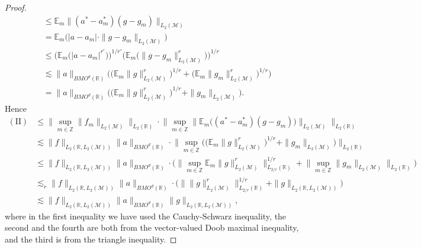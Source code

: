 \documentclass[oneside,english,a4wide]{amsart}
\numberwithin{equation}{section}
\numberwithin{figure}{section}
\theoremstyle{plain}
\theoremstyle{plain}
\theoremstyle{definition}
\theoremstyle{plain}
\theoremstyle{remark}
\theoremstyle{definition}
\theoremstyle{remark}
\theoremstyle{definition}
\newcommand{\8}{\infty}
\begin{document}
\begin{proof}
\begin{equation*}
\begin{aligned}
			&\le \mathbb{E}_{m}\big\|(a^*-a^*_m)(g-g_m)\big\|_{L_2(\mathcal{M})}\\
			&=\mathbb{E}_{m}\big(|a-a_m|\cdot\|g-g_m\|_{L_2(\mathcal{M})}\big)\\
			&\le \bigl(\mathbb{E}_{m}\big(|a-a_m|^{r'}\big)\bigr)^{1/r'}\bigl(\mathbb{E}_{m}\big(\|g-g_m\|_{L_2(\mathcal{M})}^{r}\big)\bigr)^{1/r}\\
			&\lesssim \|a\|_{BMO^d(\mathbb{R})}\biggl(\bigl(\mathbb{E}_{m}\|g\|_{L_2(\mathcal{M})}^{r}\bigr)^{1/r}+\bigl(\mathbb{E}_{m}\|g_m\|_{L_2(\mathcal{M})}^{r}\bigr)^{1/r}\biggr)\\
			&=\|a\|_{BMO^d(\mathbb{R})}\biggl(\bigl(\mathbb{E}_{m}\|g\|_{L_2(\mathcal{M})}^{r}\bigr)^{1/r}+\|g_m\|_{L_2(\mathcal{M})}\biggr).
		\end{aligned}
	\end{equation*}
	Hence
	\begin{equation}\label{II}
		\begin{aligned}
			(\text{II}){}&\le \bigg\|\sup_{m\in\mathbb{Z}}\|f_m\|_{L_2(\mathcal{M})}\bigg\|_{L_2(\mathbb{R})}\cdot\biggl\|\sup_{m\in\mathbb{Z}}\big\|\mathbb{E}_{m}\big((a^*-a^*_m)(g-g_m)\big)\big\|_{L_2(\mathcal{M})}\biggr\|_{L_2(\mathbb{R})} \\
			&\lesssim \|f\|_{L_2(\mathbb{R},L_2(\mathcal{M}))}\|a\|_{BMO^d(\mathbb{R})}\cdot \biggl\|\sup_{m\in\mathbb{Z}}\biggl(\bigl(\mathbb{E}_{m}\|g\|_{L_2(\mathcal{M})}^{r}\bigr)^{1/r}+\|g_m\|_{L_2(\mathcal{M})}\biggr)\bigg\|_{L_2(\mathbb{R})}\\
			&\le \|f\|_{L_2(\mathbb{R},L_2(\mathcal{M}))}\|a\|_{BMO^d(\mathbb{R})}\cdot \biggl(\biggl\|\sup_{m\in\mathbb{Z}}\mathbb{E}_{m}\|g\|_{L_2(\mathcal{M})}^{r}\bigg\|^{1/r}_{L_{2/r}(\mathbb{R})}+\biggl\|\sup_{m\in\mathbb{Z}}\|g_m\|_{L_2(\mathcal{M})}\bigg\|_{L_2(\mathbb{R})}\biggr)\\
			&\lesssim_r \|f\|_{L_2(\mathbb{R},L_2(\mathcal{M}))}\|a\|_{BMO^d(\mathbb{R})}\cdot \big(\big\|\|g\|_{L_2(\mathcal{M})}^{r}\big\|^{1/r}_{L_{2/r}(\mathbb{R})}+\|g\|_{L_2(\mathbb{R},L_2(\mathcal{M}))}\big)\\
			&\lesssim \|f\|_{L_2(\mathbb{R},L_2(\mathcal{M}))}\|a\|_{BMO^d(\mathbb{R})}\|g\|_{L_2(\mathbb{R},L_2(\mathcal{M}))},
		\end{aligned}
	\end{equation}
	where in the first inequality we have used the Cauchy-Schwarz inequality, the second and the fourth are both from the vector-valued Doob maximal inequality, and the third is from the triangle inequality.
	

\end{proof}
\end{document}
